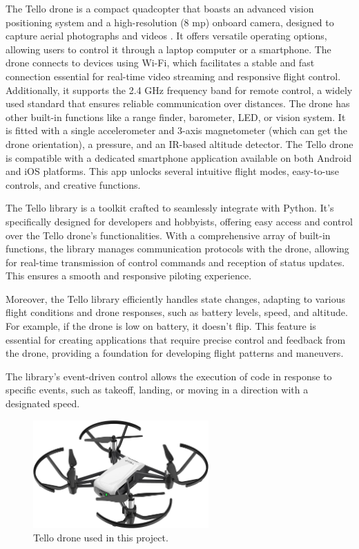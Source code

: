 The Tello drone is a compact quadcopter that boasts an advanced vision positioning system and a high-resolution (8 mp) onboard camera, designed to capture aerial photographs and videos \cite{tello2023specs}.
 It offers versatile operating options, allowing users to control it through a laptop computer or a smartphone. The drone connects to devices using Wi-Fi, which facilitates a stable and fast connection essential for real-time video streaming and responsive flight control. Additionally, it supports the 2.4 GHz frequency band for remote control, a widely used standard that ensures reliable communication over distances. The drone has other built-in functions like a range finder, barometer, LED, or vision system. It is fitted with a single accelerometer and 3-axis magnetometer (which can get the drone orientation), a pressure, and an IR-based altitude detector. The Tello drone is compatible with a dedicated smartphone application available on both Android and iOS platforms. This app unlocks several intuitive flight modes, easy-to-use controls, and creative functions.

The Tello library is a toolkit crafted to seamlessly integrate with Python. It's specifically designed for developers and hobbyists, offering easy access and control over the Tello drone's functionalities. With a comprehensive array of built-in functions, the library manages communication protocols with the drone, allowing for real-time transmission of control commands and reception of status updates. This ensures a smooth and responsive piloting experience.

Moreover, the Tello library efficiently handles state changes, adapting to various flight conditions and drone responses, such as battery levels, speed, and altitude. For example, if the drone is low on battery, it doesn't flip. This feature is essential for creating applications that require precise control and feedback from the drone, providing a foundation for developing flight patterns and maneuvers.

The library's event-driven control allows the execution of code in response to specific events, such as takeoff, landing, or moving in a direction with a designated speed.

\begin{figure}[h!]
	\centering
	\includegraphics[width = 0.6\textwidth]{images/drone.jpg}
	\caption{Tello drone used in this project.}
	\label{fig:tello}
\end{figure}

